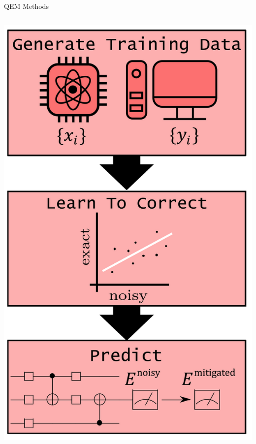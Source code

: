 \documentclass[11pt,aspectratio=1610,xcolor=dvipsnames]{beamer}
\begin{document}
\begin{frame}{QEM Methods}
\begin{columns}[T]
\begin{column}{0.33\textwidth}
\begin{tcolorbox}[title=Learning-based methods,halign title=center,halign=center,colback=gray!20, colframe=gray!70]
				\includegraphics[width=\textwidth]{learning-based.png}
			\end{tcolorbox}

		\end{column}
	\end{columns}
\end{frame}
\end{document}
